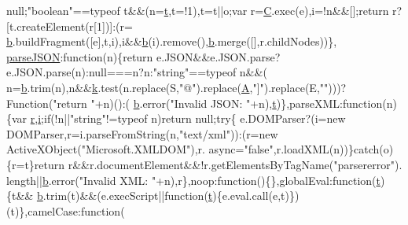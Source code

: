 \begin{DoxyCode}
      null;\textcolor{stringliteral}{"boolean"}==typeof t&&(n=\hyperlink{jquery-1_89_81_8min_8js_a23c5666e83bbbceee94adcd0851f50c4}{t},t=!1),t=t||o;var r=\hyperlink{jquery-migrate-1_82_81_8min_8js_ae59e0ac8d0c43c81f50236f719763efc}{C}.exec(e),i=!n&&[];\textcolor{keywordflow}{return} r?[t.createElement(r[1])]:(r=
      \hyperlink{jquery-1_89_81_8min_8js_ac50ac660762310348a84d5558c651020}{b}.buildFragment([e],t,i),i&&\hyperlink{jquery-1_89_81_8min_8js_ac50ac660762310348a84d5558c651020}{b}(i).remove(),\hyperlink{jquery-1_89_81_8min_8js_ac50ac660762310348a84d5558c651020}{b}.merge([],r.childNodes))\},
      \hyperlink{jquery-migrate-1_82_81_8min_8js_a78744aa01b6245cc7f2a7fedfe14a390}{parseJSON}:\textcolor{keyword}{function}(n)\{\textcolor{keywordflow}{return} e.JSON&&e.JSON.parse?e.JSON.parse(n):null===n?n:\textcolor{stringliteral}{"string"}==typeof n&&(
      n=\hyperlink{jquery-1_89_81_8min_8js_ac50ac660762310348a84d5558c651020}{b}.trim(n),n&&\hyperlink{jquery-migrate-1_82_81_8min_8js_ab26645c014aa005ecedef329ecf58c99}{k}.test(n.replace(S,\textcolor{stringliteral}{"@"}).replace(\hyperlink{jquery-migrate-1_82_81_8min_8js_a9757042cb6157b0f84e78a5ff4aa6f93}{A},\textcolor{stringliteral}{"]"}).replace(E,\textcolor{stringliteral}{""})))?Function(\textcolor{stringliteral}{"return "}+n)():(
      \hyperlink{jquery-1_89_81_8min_8js_ac50ac660762310348a84d5558c651020}{b}.error(\textcolor{stringliteral}{"Invalid JSON: "}+n),\hyperlink{jquery-1_89_81_8min_8js_a23c5666e83bbbceee94adcd0851f50c4}{t})\},parseXML:\textcolor{keyword}{function}(n)\{var \hyperlink{prism_8js_a514f1b439f404f86f77090fa9edc96ce}{r},\hyperlink{jquery-1_89_81_8min_8js_a7e98b8a17c0aad30ba64d47b74e2a6c1}{i};\textcolor{keywordflow}{if}(!n||\textcolor{stringliteral}{"string"}!=typeof n)\textcolor{keywordflow}{return} null;\textcolor{keywordflow}{try}\{
      e.DOMParser?(i=\textcolor{keyword}{new} DOMParser,r=i.parseFromString(n,\textcolor{stringliteral}{"text/xml"})):(r=\textcolor{keyword}{new} ActiveXObject(\textcolor{stringliteral}{"Microsoft.XMLDOM"}),r.
      async=\textcolor{stringliteral}{"false"},r.loadXML(n))\}\textcolor{keywordflow}{catch}(o)\{r=t\}\textcolor{keywordflow}{return} r&&r.documentElement&&!r.getElementsByTagName(\textcolor{stringliteral}{"parsererror"}).
      length||\hyperlink{jquery-1_89_81_8min_8js_ac50ac660762310348a84d5558c651020}{b}.error(\textcolor{stringliteral}{"Invalid XML: "}+n),r\},noop:\textcolor{keyword}{function}()\{\},globalEval:\textcolor{keyword}{function}(\hyperlink{jquery-1_89_81_8min_8js_a23c5666e83bbbceee94adcd0851f50c4}{t})\{t&&
      \hyperlink{jquery-1_89_81_8min_8js_ac50ac660762310348a84d5558c651020}{b}.trim(t)&&(e.execScript||\textcolor{keyword}{function}(\hyperlink{jquery-1_89_81_8min_8js_a23c5666e83bbbceee94adcd0851f50c4}{t})\{e.eval.call(e,t)\})(t)\},camelCase:\textcolor{keyword}{function}(

\end{DoxyCode}
